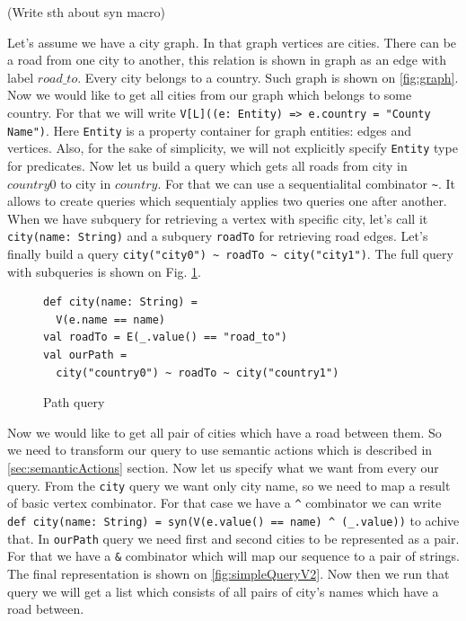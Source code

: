 (Write sth about syn macro)

Let's assume we have a city graph. In that graph vertices are cities. There can be a road from one city to another, this relation is shown in graph as an edge with label $road\_to$. Every city belongs to a country. Such graph is shown on \ref{fig:graph}. Now we would like to get all cities from our graph which belongs to some country. For that we will write \lstinline{V[L]((e: Entity) => e.country = "County Name")}. Here \lstinline{Entity} is a property container for graph entities: edges and vertices. Also, for the sake of simplicity, we will not explicitly specify \lstinline{Entity} type for predicates. Now let us build a query which gets all roads from city in $country0$ to city in $country$. For that we can use a sequentialital combinator \lstinline{~}. It allows to create queries which sequentialy applies two queries one after another. When we have subquery for retrieving a vertex with specific city, let's call it \lstinline{city(name: String)} and a subquery \lstinline{roadTo} for retrieving road edges. Let's finally build a query \lstinline{city("city0") ~ roadTo ~ city("city1")}. The full query with subqueries is shown on Fig. \ref{fig:simpleQuery}.

\begin{figure}[h]
\begin{lstlisting}
def city(name: String) =
  V(e.name == name)
val roadTo = E(_.value() == "road_to")
val ourPath = 
  city("country0") ~ roadTo ~ city("country1")
\end{lstlisting}
\caption{Path query}
\label{fig:simpleQuery}
\end{figure}



Now we would like to get all pair of cities which have a road between them. So we need to transform our query to use semantic actions which is described in \ref{sec:semanticActions} section. Now let us specify what we want from every our query. From the \lstinline{city} query we want only city name, so we need to map a result of basic vertex combinator. For that case we have a \lstinline{^} combinator we can write \lstinline{def city(name: String) = syn(V(e.value() == name) ^ (_.value))} to achive that. In \lstinline{ourPath} query we need first and second cities to be represented as a pair. For that we have a \lstinline{&} combinator which will map our sequence to a pair of strings. The final representation is shown on \ref{fig:simpleQueryV2}. Now then we run that query we will get a list which consists of all pairs of city's names which have a road between.

